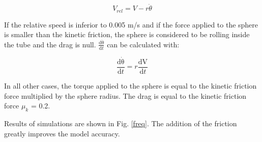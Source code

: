 \documentclass[letterpaper, 10 pt, conference]{ieeeconf}  %
\begin{document}
\begin{equation}
V_{rel}=V-r\dot{\theta}
\label{relV}
\end{equation}

 
If the relative speed is inferior to 0.005 m/s and if the force applied to the sphere is smaller than the kinetic friction, the sphere is considered to be rolling inside the tube and the drag is null. $\frac{\mathrm{d\dot{\theta} } }{\mathrm{d} t}$ can be calculated with:

\begin{equation}
\frac{\mathrm{d\dot{\theta} } }{\mathrm{d} t}=r\frac{\mathrm{dV } }{\mathrm{d} t}
\label{domega}
\end{equation}

In all other cases, the torque applied to the sphere is equal to the kinetic friction force multiplied by the sphere radius. The drag is equal to the kinetic friction force $\mu_k$ = 0.2.\par
Results of simulations are shown in Fig. \ref{freq}. The addition of the friction greatly improves the model accuracy.



\end{document}
